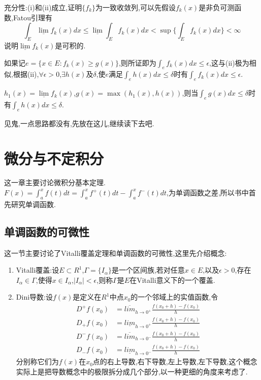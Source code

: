 \documentclass[12pt,a4paper,openany]{book}
\begin{document}
充分性:(i)和(ii)成立,证明$\{f_k\}$为一致收敛列,可以先假设$f_k(x)$是非负可测函数,Fatou引理有
\[
\int_{E}{\underline{\lim}f_k(x)dx} \le \underline{\lim}{\int_{E}{f_k(x)dx}}<\sup\{\int_{E}{f_k(x)dx}\}<\infty
\]
说明$\underline{\lim}{f_k(x)}$是可积的.

如果记$e = \{x \in E: f_k(x) \ge g(x)\}$,则所证即为$\int_{e}{f_k(x)dx} \le \epsilon$,这与(ii)极为相似,根据(ii),$\forall \epsilon>0$,$\exists h(x)$及$\delta$,使$e$满足$\int_{e}{h(x)dx} \le \delta$时有$\int_{e}{f_k(x)dx} \le \epsilon$.

$h_1(x) = \underline{\lim}{f_k(x)}$,$g(x)=\max(h_1(x), h(x))$,则当$\int_{e}{g(x)dx} \le \delta$时有$\int_{e}{h(x)dx} \le \delta$.

见鬼,一点思路都没有,先放在这儿,继续读下去吧.

\chapter{微分与不定积分}
这一章主要讨论微积分基本定理.$F(x) = \int_{a}^{x}{f(t)dt} = \int_{a}^{x}{f^+(t)dt} - \int_{a}^{x}{f^-(t)dt}$,为单调函数之差,所以书中首先研究单调函数.

\section{单调函数的可微性}

这一节主要讨论了Vitalli覆盖定理和单调函数的可微性,这里先介绍概念:

\begin{enumerate}
\item Vitalli覆盖:设$E \subset R^1$,$\Gamma=\{I_{\alpha}\}$是一个区间族,若对任意$x\in E$,以及$\epsilon>0$,存在$I_{\alpha} \in \Gamma$,使得$x \in I_{\alpha}$,$|I_{\alpha}|<\epsilon$,则称$\Gamma$是$E$在Vitalli意义下的一个覆盖.

\item Dini导数:设$f(x)$是定义在$R^1$中点$x_0$的一个邻域上的实值函数,令
\[
\begin{aligned}
D^+f(x_0) &= \overline{lim}_{h \rightarrow 0^+}{\frac{f(x_0 + h) - f(x_0)}{h}}\\
D_+f(x_0) &= \underline{lim}_{h \rightarrow 0^+}{\frac{f(x_0 + h) - f(x_0)}{h}}\\
D^-f(x_0) &= \overline{lim}_{h \rightarrow 0^-}{\frac{f(x_0 + h) - f(x_0)}{h}}\\
D_-f(x_0) &= \underline{lim}_{h \rightarrow 0^-}{\frac{f(x_0 + h) - f(x_0)}{h}}
\end{aligned}
\]
分别称它们为$f(x)$在$x_0$点的右上导数,右下导数,左上导数,左下导数,这个概念实际上是把导数概念中的极限拆分成几个部分,以一种更细的角度来考虑了.
\end{enumerate}
\end{document}
